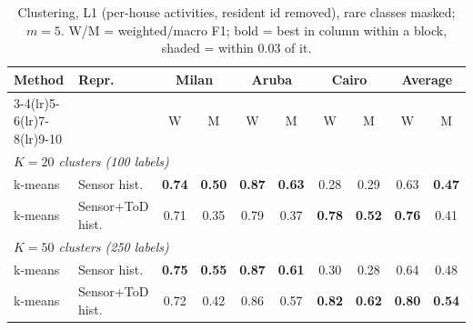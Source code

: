 \begin{table}[H]
\centering\small
\caption{Clustering, L1 (per-house activities, resident id removed), rare classes masked; $m=5$. W/M = weighted/macro F1; bold = best in column within a block, shaded = within 0.03 of it.}
\label{tab:clu_l1_masked_m5}
\setlength{\tabcolsep}{3.5pt}
\begin{tabular}{llcc|cc|cc|cc}
\toprule
Method & Repr. & \multicolumn{2}{c}{Milan} & \multicolumn{2}{c}{Aruba} & \multicolumn{2}{c}{Cairo} & \multicolumn{2}{c}{Average} \\
\cmidrule(lr){3-4}\cmidrule(lr){5-6}\cmidrule(lr){7-8}\cmidrule(lr){9-10}
 & & W & M & W & M & W & M & W & M \\
\midrule
\multicolumn{10}{l}{\textit{$K = 20$ clusters (100 labels)}} \\
\midrule
k-means & Sensor hist. & \cellcolor{blue!12}\textbf{0.74} & \cellcolor{blue!12}\textbf{0.50} & \cellcolor{blue!12}\textbf{0.87} & \cellcolor{blue!12}\textbf{0.63} & 0.28 & 0.29 & 0.63 & \cellcolor{blue!12}\textbf{0.47} \\
k-means & Sensor+ToD hist. & \cellcolor{blue!12}0.71 & 0.35 & 0.79 & 0.37 & \cellcolor{blue!12}\textbf{0.78} & \cellcolor{blue!12}\textbf{0.52} & \cellcolor{blue!12}\textbf{0.76} & 0.41 \\
\midrule
\multicolumn{10}{l}{\textit{$K = 50$ clusters (250 labels)}} \\
\midrule
k-means & Sensor hist. & \cellcolor{blue!12}\textbf{0.75} & \cellcolor{blue!12}\textbf{0.55} & \cellcolor{blue!12}\textbf{0.87} & \cellcolor{blue!12}\textbf{0.61} & 0.30 & 0.28 & 0.64 & 0.48 \\
k-means & Sensor+ToD hist. & \cellcolor{blue!12}0.72 & 0.42 & \cellcolor{blue!12}0.86 & 0.57 & \cellcolor{blue!12}\textbf{0.82} & \cellcolor{blue!12}\textbf{0.62} & \cellcolor{blue!12}\textbf{0.80} & \cellcolor{blue!12}\textbf{0.54} \\
\bottomrule
\end{tabular}
\end{table}

